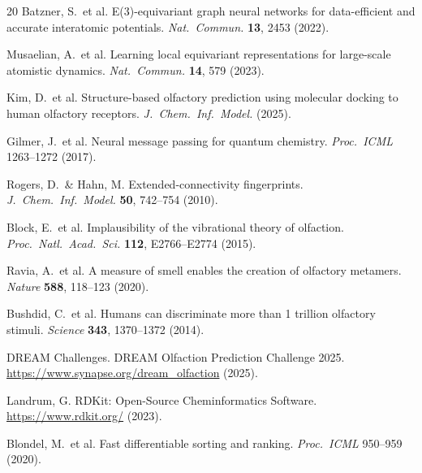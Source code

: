 \documentclass[11pt,a4paper]{article}
\begin{document}
\begin{thebibliography}{20}
 Batzner, S.\ et al. E(3)-equivariant graph neural networks for data-efficient and accurate interatomic potentials. \emph{Nat.\ Commun.} \textbf{13}, 2453 (2022).

 Musaelian, A.\ et al. Learning local equivariant representations for large-scale atomistic dynamics. \emph{Nat.\ Commun.} \textbf{14}, 579 (2023).

 Kim, D.\ et al. Structure-based olfactory prediction using molecular docking to human olfactory receptors. \emph{J.\ Chem.\ Inf.\ Model.} (2025).

 Gilmer, J.\ et al. Neural message passing for quantum chemistry. \emph{Proc.\ ICML} 1263--1272 (2017).

 Rogers, D.\ \& Hahn, M. Extended-connectivity fingerprints. \emph{J.\ Chem.\ Inf.\ Model.} \textbf{50}, 742--754 (2010).

 Block, E.\ et al. Implausibility of the vibrational theory of olfaction. \emph{Proc.\ Natl.\ Acad.\ Sci.} \textbf{112}, E2766--E2774 (2015).

 Ravia, A.\ et al. A measure of smell enables the creation of olfactory metamers. \emph{Nature} \textbf{588}, 118--123 (2020).

 Bushdid, C.\ et al. Humans can discriminate more than 1 trillion olfactory stimuli. \emph{Science} \textbf{343}, 1370--1372 (2014).

 DREAM Challenges. DREAM Olfaction Prediction Challenge 2025. \url{https://www.synapse.org/dream_olfaction} (2025).

 Landrum, G. RDKit: Open-Source Cheminformatics Software. \url{https://www.rdkit.org/} (2023).

 Blondel, M.\ et al. Fast differentiable sorting and ranking. \emph{Proc.\ ICML} 950--959 (2020).

\end{thebibliography}
\end{document}
